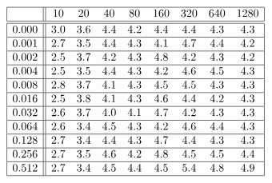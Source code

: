 \[
\begin{array}{|c||cccccccc|}
\hline 
& 10 & 20 & 40 & 80 & 160 & 320 & 640 & 1280\\
\hline \hline 
0.000 & 3.0 & 3.6 & 4.4 & 4.2 & 4.4 & 4.4 & 4.3 & 4.3 \\ \hline 
0.001 & 2.7 & 3.5 & 4.4 & 4.3 & 4.1 & 4.7 & 4.4 & 4.2 \\ \hline 
0.002 & 2.5 & 3.7 & 4.2 & 4.3 & 4.8 & 4.2 & 4.3 & 4.2 \\ \hline 
0.004 & 2.5 & 3.5 & 4.4 & 4.3 & 4.2 & 4.6 & 4.5 & 4.3 \\ \hline 
0.008 & 2.8 & 3.7 & 4.1 & 4.3 & 4.5 & 4.5 & 4.3 & 4.3 \\ \hline 
0.016 & 2.5 & 3.8 & 4.1 & 4.3 & 4.6 & 4.4 & 4.2 & 4.3 \\ \hline 
0.032 & 2.6 & 3.7 & 4.0 & 4.1 & 4.7 & 4.2 & 4.3 & 4.3 \\ \hline 
0.064 & 2.6 & 3.4 & 4.5 & 4.3 & 4.2 & 4.6 & 4.4 & 4.3 \\ \hline 
0.128 & 2.7 & 3.4 & 4.4 & 4.3 & 4.7 & 4.4 & 4.3 & 4.3 \\ \hline 
0.256 & 2.7 & 3.5 & 4.6 & 4.2 & 4.8 & 4.5 & 4.5 & 4.4 \\ \hline 
0.512 & 2.7 & 3.4 & 4.5 & 4.4 & 4.5 & 5.4 & 4.8 & 4.9 \\ \hline 
\end{array}
\]

